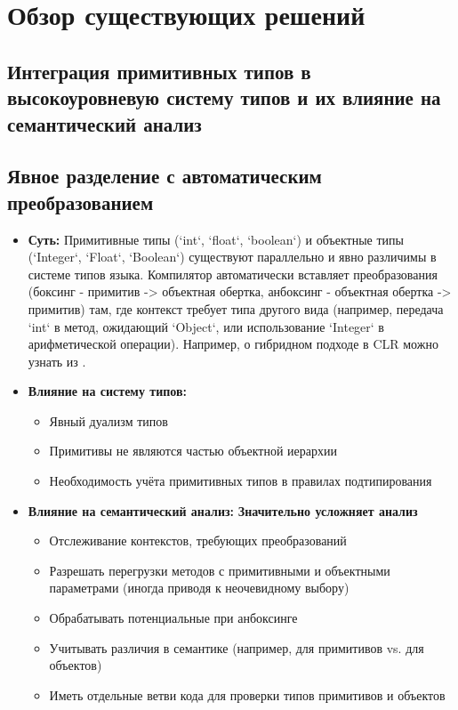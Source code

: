 \section{Обзор существующих решений}
\label{sec:Chapter2} 

\subsection*{Интеграция примитивных типов в высокоуровневую систему типов и их влияние на семантический анализ}

\subsection{Явное разделение с автоматическим преобразованием}

\begin{itemize}[label={--}]
    \item \textbf{Суть:} Примитивные типы (`int`, `float`, `boolean`) и объектные типы (`Integer`, `Float`, `Boolean`) существуют параллельно и явно различимы в системе типов языка. Компилятор автоматически вставляет преобразования (боксинг - примитив -> объектная обертка, анбоксинг - объектная обертка -> примитив) там, где контекст требует типа другого вида (например, передача `int` в метод, ожидающий `Object`, или использование `Integer` в арифметической операции). Например, о гибридном подходе в CLR можно узнать из \cite{richter2012}.

    \item \textbf{Влияние на систему типов:}
    \begin{itemize}
        \item Явный дуализм типов
        \item Примитивы не являются частью объектной иерархии
        \item Необходимость учёта примитивных типов в правилах подтипирования
    \end{itemize}

    \item \textbf{Влияние на семантический анализ:}
    \textbf{Значительно усложняет анализ}
    \begin{itemize}[label={--}]
        \item Отслеживание контекстов, требующих преобразований
        \item Разрешать перегрузки методов с примитивными и объектными параметрами (иногда приводя к неочевидному выбору)
        \item Обрабатывать потенциальные  при анбоксинге 
        \item Учитывать различия в семантике (например,  \code{==} для примитивов vs. для объектов)
        \item Иметь отдельные ветви кода для проверки типов примитивов и объектов
    \end{itemize}


\end{itemize}
